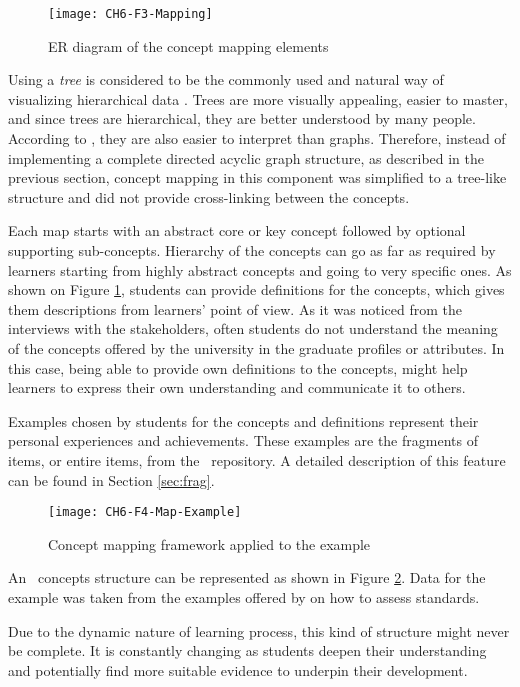 \begin{figure}[htb]
\centering
\texttt{[image: CH6-F3-Mapping]}
\caption{ER diagram of the concept mapping elements}
\label{fig:mapping}
\end{figure}

Using a \textit{tree} is considered to be the commonly used and natural way
of visualizing hierarchical data \citep{Gorg2007,Holten2006}. Trees are more
visually appealing, easier to master, and since trees are hierarchical, they are
better understood by many people. According to \citet{LeGrand2006}, they are
also easier to interpret than graphs. Therefore, instead of implementing a
complete directed acyclic graph structure, as described in the previous section,
concept mapping in this component was simplified to a tree-like structure and
did not provide cross-linking between the concepts.

Each map starts with an abstract core or key concept followed by optional
supporting sub-concepts. Hierarchy of the concepts can go as far as required by
learners starting from highly abstract concepts and going to very specific ones.
As shown on Figure \ref{fig:mapping}, students can provide definitions for the
concepts, which gives them descriptions from learners' point of view. As it was
noticed from the interviews with the stakeholders, often students do not
understand the meaning of the concepts offered by the university in the graduate
profiles or attributes. In this case, being able to provide own definitions to
the concepts, might help learners to express their own understanding and
communicate it to others.

Examples chosen by students for the concepts and definitions represent their
personal experiences and achievements. These examples are the fragments of
items, or entire items, from the \ep~repository. A detailed description of this
feature can be found in Section \ref{sec:frag}.

\begin{figure}[htb]
\centering
\texttt{[image: CH6-F4-Map-Example]}
\caption{Concept mapping framework applied to the example}
\label{fig:mapex} 
\end{figure}

An \ep~concepts structure can be represented as shown in Figure \ref{fig:mapex}.
Data for the example was taken from the examples offered by \citet{Marzano1993}
on how to assess \LLLs standards.

Due to the dynamic nature of learning process, this kind of structure might
never be complete. It is constantly changing as students deepen their
understanding and potentially find more suitable evidence to underpin their
development.

